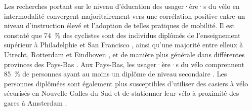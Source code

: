 \begin{refsegment}
Les recherches portant sur le niveau d'éducation des usager·ère·s du vélo en intermodalité convergent majoritairement vers une corrélation positive entre un niveau d'instruction élevé et l'adoption de telles pratiques de mobilité. Il est constaté que 74~\% des cyclistes sont des individus diplômés de l'enseignement supérieur à Philadelphie et San Francisco \textcolor{blue}{\autocite[103]{flamm_public_2014}}, ainsi qu'une majorité entre elleux à Utrecht, Rotterdam et Eindhoven \textcolor{blue}{\autocite[11]{jonkeren_bicycle-train_2021}}, et de manière plus générale dans différentes provinces des Pays-Bas \textcolor{blue}{\autocite[113]{heinen_multimodal_2014}}. Aux Pays-Bas, les usager·ère·s du vélo comprennent 85~\% de personnes ayant au moins un diplôme de niveau secondaire \textcolor{blue}{\autocite[15]{shelat_analysing_2018}}. Les personnes diplômées sont également plus susceptibles d'utiliser des casiers à vélo sécurisés en Nouvelle-Galles du Sud \textcolor{blue}{\autocite[18]{arbis_analysis_2016}}
 et de stationner leur vélo à proximité des gares à Amsterdam \textcolor{blue}{\autocite[344]{kampen_bicycle_2021}}.%


\end{refsegment}
